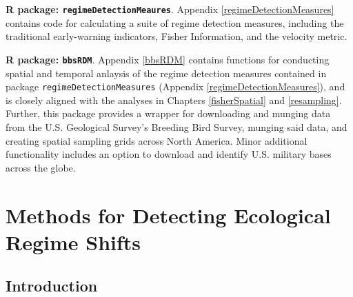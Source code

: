 \documentclass[12pt,twoside,openany]{reedthesis}
\begin{document}
\textbf{R package: \texttt{regimeDetectionMeaures}}. Appendix \ref{regimeDetectionMeasures} contains code for calculating a suite of regime detection measures, including the traditional early-warning indicators, Fisher Information, and the velocity metric.

\textbf{R package: \texttt{bbsRDM}}. Appendix \ref{bbsRDM} contains functions for conducting spatial and temporal anlaysis of the regime detection measures contained in package \texttt{regimeDetectionMeasures} (Appendix \ref{regimeDetectionMeasures}), and is closely aligned with the analyses in Chapters \ref{fisherSpatial} and \ref{resampling}. Further, this package provides a wrapper for downloading and munging data from the U.S. Geological Survey's Breeding Bird Survey, munging said data, and creating spatial sampling grids across North America. Minor additional functionality includes an option to download and identify U.S. military bases across the globe.

\hypertarget{rdmReview}{%
\chapter{Methods for Detecting Ecological Regime Shifts}\label{rdmReview}}

\hypertarget{introduction}{%
\section{Introduction}\label{introduction}}
\end{document}
